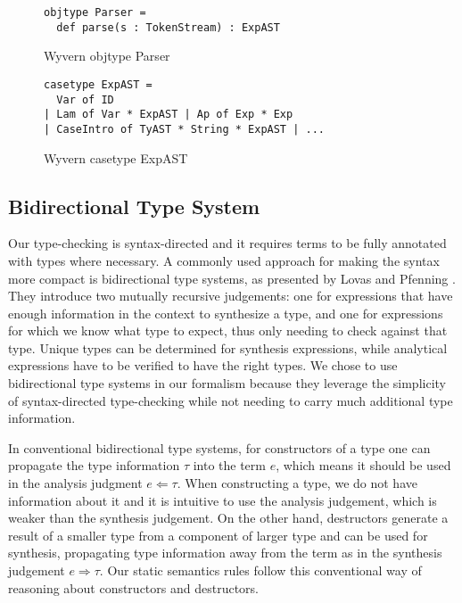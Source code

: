 \begin{figure}
\begin{lstlisting}
objtype Parser = 
  def parse(s : TokenStream) : ExpAST
\end{lstlisting}
\caption{Wyvern objtype Parser}
\label{}
\end{figure}

\begin{figure}
\begin{lstlisting}
casetype ExpAST = 
  Var of ID 
| Lam of Var * ExpAST | Ap of Exp * Exp 
| CaseIntro of TyAST * String * ExpAST | ...
\end{lstlisting}
\caption{Wyvern casetype ExpAST}
\label{}
\end{figure}

\subsection{Bidirectional Type System}
Our type-checking is syntax-directed and it requires terms to be fully annotated with types where necessary. A commonly used approach for making the syntax more compact is bidirectional type systems, as presented by Lovas and Pfenning \cite{Lovas08abidirectional}. They introduce two mutually recursive judgements: one for expressions that have enough information in the context to synthesize a type, and one for expressions for which we know what type to expect, thus only needing to check against that type. Unique types can be determined for synthesis expressions, while analytical expressions have to be verified to have the right types. We chose to use bidirectional type systems in our formalism because they leverage the simplicity of syntax-directed type-checking while not needing to carry much additional type information.

In conventional bidirectional type systems, for constructors of a type one can propagate the type information $\tau$
into the term $e$, which means it should be used in the analysis
judgment $e \Leftarrow \tau$. When constructing a type, we do not have information about it and it is intuitive to use the analysis judgement, which is weaker than the synthesis judgement. On the other hand, destructors generate a result of a smaller type from a component of larger type and can be used for synthesis, propagating type information away from the term as in the synthesis judgement $e \Rightarrow \tau$. Our static semantics rules follow this conventional way of reasoning about constructors and destructors.


